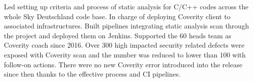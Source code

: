 \begin{cventries}
{\begin{cvitems}
        \item{Led setting up criteria and process of static analysis for C/C++ codes across the whole Sky Deutschland code base. In charge of deploying Coverity client to associated infrastructures. Built pipelines integrating static analysis scan through the project and deployed them on Jenkins. Supported the 60 heads team as Coverity coach since 2016. Over 300 high impacted security related defects were exposed with Coverity scan and the number was reduced to lower than 100 with follow-on actions. There were no new Coverity error introduced into the release since then thanks to the effective process and CI pipelines.}
      \end{cvitems}
    }
    \begin{flushleft}
    \end{flushleft}
\end{cventries}
